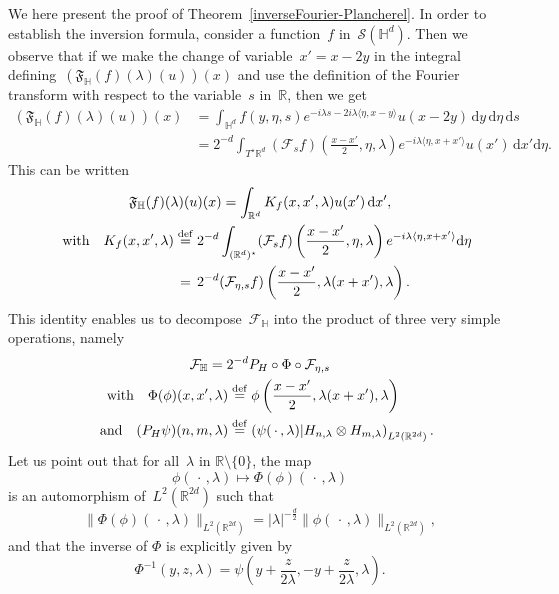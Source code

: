 \documentclass[10pt]{amsart}
\theoremstyle{definition}\newtheorem{defi}[theo]{Definition}\newtheorem{rema}[theo]{Remark}\newtheorem{exam}[theo]{Example}\newtheorem{exem}[theo]{Example}\newtheorem{nota}[theo]{Notation}
\newcommand{\lam}{\lambda}
\newcommand*\cF{\mathcal{F}}
\newcommand*\cS{\mathcal{S}}
\newcommand*\fF{\mathfrak{F}}
\newcommand*\R{\mathbb{R}}
\newcommand*\bbH{\mathbb{H}}
\newcommand{\andf}{\quad\hbox{and}\quad}
\newcommand{\with}{\quad\hbox{with}\quad}
\newcommand*\eqdefa{\overset{\mathrm{def}}{=}}
\newcommand*\peqdefa{\overset{\phantom{\mathrm{def}}}{=}}
\newcommand*{\dd}{\mathrm{d}}
\newcommand{\ds}{\dd s}
\newcommand{\dx}{\dd x}
\newcommand{\dy}{\dd y}
\newcommand{\deta}{\dd \eta}
\renewcommand*{\cdotp}{.}
\begin{document}
We here present the proof of Theorem~\ref{inverseFourier-Plancherel}. In order to establish the inversion formula, consider a function~$f$ in~$\cS(\bbH^d)$. Then we observe that if we make the change of variable~$x'= x-2y$ in the integral defining~$(\fF_{\bbH}(f)(\lam)(u))(x)$ and use the definition of the Fourier transform with respect to the variable~$s$ in~$\R$, then we get
\begin{equation}
\begin{aligned}\label{formulaFourerHbis-1}
\left(\fF_{\bbH}(f)(\lam)(u)\right)(x) &=
\int_{\bbH^d} f(y,\eta,s) e^{-i\lam s -2i\lam \langle \eta, x-y\rangle} u(x-2y)\,\dy\,\deta\, \ds\\
&= 2^{-d}\int_{T^\star \R^d} (\cF_s f)\left(\frac {x-x'} 2,\eta, \lam\right) e^{-i\lam \langle \eta, x+x'\rangle} u(x') \,\dx'\deta.
\end{aligned}
\end{equation}
This can be written
\begin{equation}\label{formulaFourerHbis}
\begin{gathered}
\fF_{\bbH}(f)(\lam) (u)(x) = \int_{\R^d} K_f(x,x',\lam) u(x')\, \dx',\\
\begin{aligned}
\with K_f(x,x',\lam) &\eqdefa 2^{-d} \int_{(\R^d)^\star } (\cF_s f)\left(\frac {x-x'} 2,\eta, \lam\right) e^{-i\lam \langle \eta, x+x'\rangle} \deta\\
&\peqdefa 2^{-d} (\cF_{\eta,s} f)\left(\frac {x-x'} 2,\lam(x+x'), \lam\right).
\end{aligned}
\end{gathered}
\end{equation}
This identity enables us to decompose~$\cF_\bbH$ into the product of three very simple operations, namely
\begin{equation}\label{decomF_H}
\begin{gathered}
\cF_\bbH = 2^{-d}P_H \circ \Phi\circ \cF_{\eta,s}\\
\begin{aligned}
\with \Phi(\phi)(x,x',\lam) & \eqdefa \phi \left(\frac {x-x'} 2,\lam(x+x'), \lam\right)\\
\andf (P_H\psi)(n,m,\lam) & \eqdefa \left(\psi({\,\cdot\,},\lam)| H_{n,\lam} \otimes H_{m,\lam}\right)_{L^2(\R^{2d})}.
\end{aligned}
\end{gathered}
\end{equation}
Let us point out that for all~$\lam$ in $\R\setminus\{0\}$, the map
\[
\phi({\,\cdot\,},\lam) \longmapsto \Phi(\phi)({\,\cdot\,}, \lam)
\]
is an automorphism of~$L^2(\R^{2d})$ such that
\begin{equation}\label{inverseFourierL2demoeq1}
\|\Phi(\phi) ({\,\cdot\,},\lam)\|_{L^2(\R^{2d})} =|\lam|^{- \frac d 2} \|\phi({\,\cdot\,},\lam)\|_{L^2(\R^{2d})},
\end{equation}
and that the inverse of $\Phi$ is explicitly given by
\begin{equation}\label{inverseFourierL2demoeq2}
\Phi^{-1} (y,z,\lam)= \psi \left (y+\frac z {2\lam}, -y+\frac z {2\lam}, \lam \right)\cdotp
\end{equation}
\end{document}
